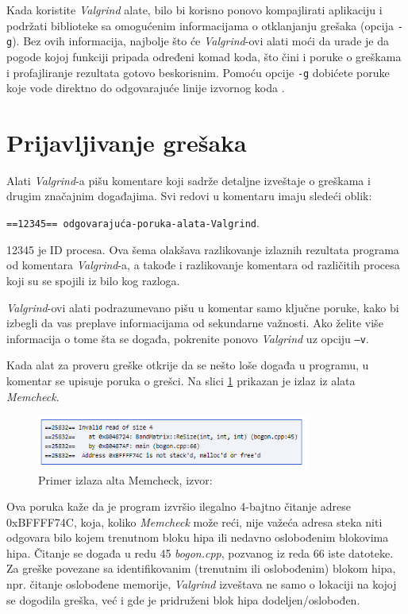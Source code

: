 \documentclass[12pt,oneside]{memoir}
\theoremstyle{plain}
\theoremstyle{definition}
\begin{document}
Kada koristite \textit{Valgrind} alate, bilo bi korisno ponovo kompajlirati aplikaciju i podržati biblioteke sa omogućenim informacijama o otklanjanju grešaka (opcija \texttt{-g}). Bez ovih informacija, najbolje što će \textit{Valgrind}-ovi alati  moći da urade je da pogode kojoj funkciji pripada određeni komad koda, što čini i poruke o greškama i profajliranje rezultata gotovo beskorisnim. Pomoću opcije \texttt{-g} dobićete poruke koje vode direktno do odgovarajuće linije izvornog koda \cite{ValgrindCore}.

\section{Prijavljivanje grešaka}
Alati \textit{Valgrind}-a pišu komentare koji sadrže detaljne izveštaje o greškama i drugim značajnim događajima. Svi redovi u komentaru imaju sledeći oblik:
\begin{center}
\texttt{==12345== odgovarajuća-poruka-alata-Valgrind}.
\end{center}
12345 je ID procesa. Ova šema olakšava razlikovanje izlaznih rezultata programa od komentara \textit{Valgrind}-a, a takođe i razlikovanje komentara od različitih procesa koji su se spojili iz bilo kog razloga.

\textit{Valgrind}-ovi alati podrazumevano pišu u komentar samo ključne poruke, kako bi izbegli da vas preplave informacijama od sekundarne važnosti. Ako želite više informacija o tome šta se događa, pokrenite ponovo \textit{Valgrind} uz opciju \texttt{–v}.

Kada alat za proveru greške otkrije da se nešto loše događa u programu, u komentar se upisuje poruka o grešci. Na slici \ref{fig:slika2.1} prikazan je izlaz iz alata \textit{Memcheck}.
\begin{figure}[!ht]
  \centering
  \includegraphics[width=0.8\textwidth]{errorReporting.png}
  \caption{Primer izlaza alta Memcheck, izvor: \cite{ValgrindCore}}
  \label{fig:slika2.1}
\end{figure}

Ova poruka kaže da je program izvršio ilegalno 4-bajtno čitanje adrese 0xBFFFF74C, koja, koliko \textit{Memcheck} može reći, nije važeća adresa steka niti odgovara bilo kojem trenutnom bloku hipa ili nedavno oslobođenim blokovima hipa. Čitanje se događa u redu 45 \textit{bogon.cpp}, pozvanog iz reda 66 iste datoteke. Za greške povezane sa identifikovanim (trenutnim ili oslobođenim) blokom hipa, npr. čitanje oslobođene memorije, \textit{Valgrind} izveštava ne samo o lokaciji na kojoj se dogodila greška, već i gde je pridruženi blok hipa dodeljen/oslobođen.
\end{document}
